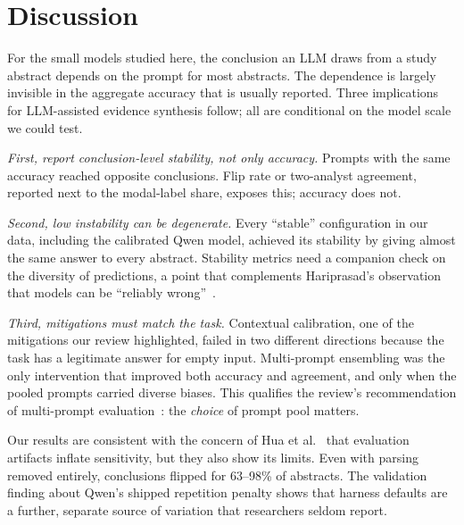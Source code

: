 \section{Discussion}
\label{sec:discussion}
For the small models studied here, the conclusion an LLM draws from a study abstract depends on the prompt for most abstracts. The dependence is largely invisible in the aggregate accuracy that is usually reported. Three implications for LLM-assisted evidence synthesis follow; all are conditional on the model scale we could test.

\emph{First, report conclusion-level stability, not only accuracy.} Prompts with the same accuracy reached opposite conclusions. Flip rate or two-analyst agreement, reported next to the modal-label share, exposes this; accuracy does not.

\emph{Second, low instability can be degenerate.} Every ``stable'' configuration in our data, including the calibrated Qwen model, achieved its stability by giving almost the same answer to every abstract. Stability metrics need a companion check on the diversity of predictions, a point that complements Hariprasad's observation that models can be ``reliably wrong''~\cite{hariprasad2026clinical}.

\emph{Third, mitigations must match the task.} Contextual calibration, one of the mitigations our review highlighted, failed in two different directions because the task has a legitimate answer for empty input. Multi-prompt ensembling was the only intervention that improved both accuracy and agreement, and only when the pooled prompts carried diverse biases. This qualifies the review's recommendation of multi-prompt evaluation~\cite{mizrahi2024stateofwhatart}: the \emph{choice} of prompt pool matters.

Our results are consistent with the concern of Hua et al.~\cite{hua2025flaw} that evaluation artifacts inflate sensitivity, but they also show its limits. Even with parsing removed entirely, conclusions flipped for 63--98\% of abstracts. The validation finding about Qwen's shipped repetition penalty shows that harness defaults are a further, separate source of variation that researchers seldom report.

